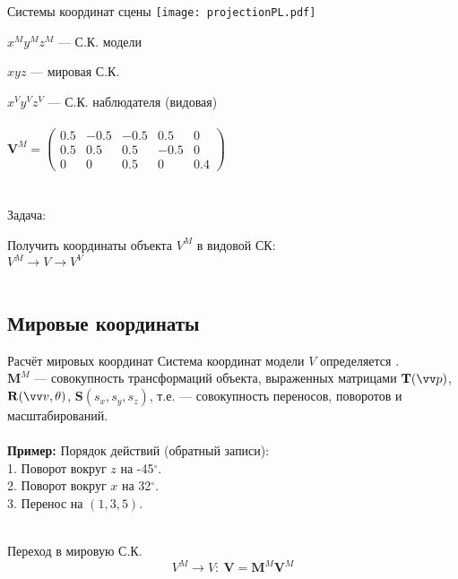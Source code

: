 \documentclass[10pt]{beamer}
\begin{document}
	\begin{frame}{Системы координат сцены}
		{
			\texttt{[image: projectionPL.pdf]}
		}
		{
			$x^My^Mz^M$  --- С.К. модели
			
			$xyz$  --- мировая С.К.
			
			$x^Vy^Vz^V$  --- С.К. наблюдателя (видовая) \\ ~ \\
			
			$\mathbf V^M
			=
			\begin{pmatrix}
				0.5 & -0.5 &-0.5& 0.5 &0\\
				0.5& 0.5 & 0.5 &-0.5& 0 \\
				0 &  0 &  0.5 &   0 & 0.4
			\end{pmatrix} $\\ ~ \\ ~ \\ 
			
			Задача:
			
			Получить координаты объекта $V^M$ в видовой СК: \\
			
			$V^M \rightarrow V \rightarrow V^V$ \\ ~ \\
			
			
		}
		
	\end{frame}
	
	\subsection{Мировые координаты}
	
	\begin{frame}{Расчёт мировых координат}
		Система координат модели $V$ определяется . \\ 
		$\mathbf M^M$  --- совокупность трансформаций объекта, выраженных матрицами $\mathbf T(\vv p)$, $\mathbf R(\vv v, \theta)$, $\mathbf S(s_x,s_y,s_z)$, т.е. --- совокупность переносов, поворотов и масштабирований. \\ ~ \\
		
		\textbf{Пример:}
		{
			Порядок действий (обратный записи):\\
			1. Поворот вокруг $z$ на -45$^\circ$.\\
			2. Поворот вокруг $x$ на 32$^\circ$.\\
			3. Перенос на $(1,3,5)$.\\
		}  ~ \\		
		
		\begin{block}{Переход в мировую С.К.}
			$$
			V^M \rightarrow V: \ \mathbf V = \mathbf M^M \mathbf V ^M
			$$
		\end{block}
		
	\end{frame}
	
\end{document}
